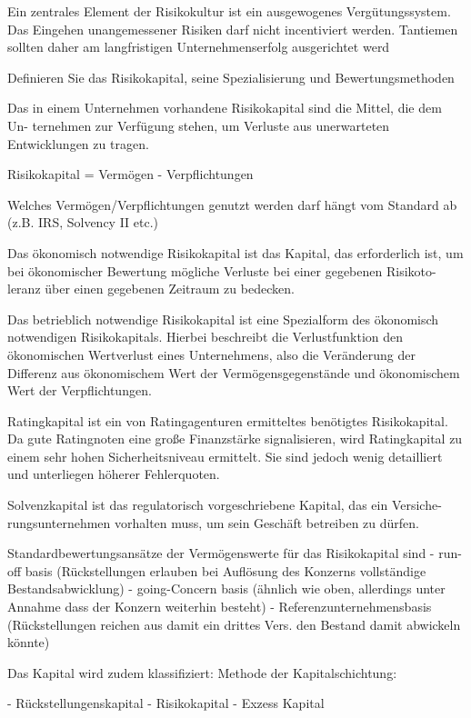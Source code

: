 Ein zentrales Element der Risikokultur ist ein ausgewogenes Vergütungssystem.
Das Eingehen unangemessener Risiken darf nicht incentiviert werden. Tantiemen
sollten daher am langfristigen Unternehmenserfolg ausgerichtet werd




Definieren Sie das Risikokapital, seine Spezialisierung und Bewertungsmethoden 


Das in einem Unternehmen vorhandene Risikokapital sind die Mittel, die dem Un-
ternehmen zur Verfügung stehen, um Verluste aus unerwarteten Entwicklungen zu
tragen. 

Risikokapital = Vermögen - Verpflichtungen 

Welches Vermögen/Verpflichtungen genutzt werden darf hängt vom Standard ab (z.B. IRS, Solvency II etc.)

Das ökonomisch notwendige Risikokapital ist das Kapital, das erforderlich ist,
um bei ökonomischer Bewertung mögliche Verluste bei einer gegebenen Risikoto-
leranz über einen gegebenen Zeitraum zu bedecken.

Das betrieblich notwendige Risikokapital ist eine Spezialform des
ökonomisch notwendigen Risikokapitals. Hierbei beschreibt die Verlustfunktion den ökonomischen Wertverlust eines Unternehmens, also die Veränderung der Differenz
aus ökonomischem Wert der Vermögensgegenstände und ökonomischem Wert der Verpflichtungen.

Ratingkapital ist ein von Ratingagenturen ermitteltes benötigtes Risikokapital. Da
gute Ratingnoten eine große Finanzstärke signalisieren, wird Ratingkapital zu einem
sehr hohen Sicherheitsniveau ermittelt. Sie sind jedoch wenig detailliert und unterliegen höherer Fehlerquoten.

Solvenzkapital ist das regulatorisch vorgeschriebene Kapital, das ein Versiche-
rungsunternehmen vorhalten muss, um sein Geschäft betreiben zu dürfen.

Standardbewertungsansätze der Vermögenswerte für das Risikokapital sind
- run-off basis (Rückstellungen erlauben bei Auflösung des Konzerns vollständige Bestandsabwicklung)
- going-Concern basis (ähnlich wie oben, allerdings unter Annahme dass der Konzern weiterhin besteht)
- Referenzunternehmensbasis (Rückstellungen reichen aus damit ein drittes Vers. den Bestand damit abwickeln könnte)

Das Kapital wird zudem klassifiziert:
Methode der Kapitalschichtung:

- Rückstellungenskapital
- Risikokapital 
- Exzess Kapital 

